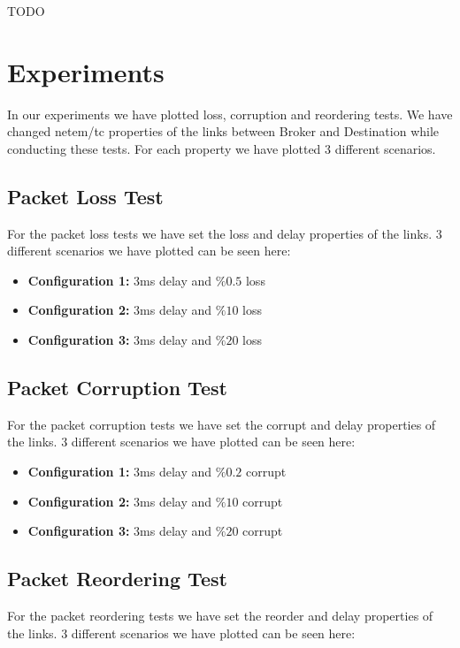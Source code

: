 \documentclass[conference]{IEEEtran}
\begin{document}
TODO

\section{Experiments}

In our experiments we have plotted loss, corruption and reordering tests. We have changed netem/tc properties of the links between Broker and Destination while conducting these tests. For each property we have plotted 3 different scenarios. 

\subsection{Packet Loss Test}\label{AA}

For the packet loss tests we have set the loss and delay properties of the links. 3 different scenarios we have plotted can be seen here:

\begin{itemize}
    \item \textbf{Configuration 1:} 3ms delay and $\%0.5$ loss
    \item \textbf{Configuration 2:} 3ms delay and $\%10$ loss
    \item \textbf{Configuration 3:} 3ms delay and $\%20$ loss
\end{itemize}

\subsection{Packet Corruption Test}\label{AA}

For the packet corruption tests we have set the corrupt and delay properties of the links. 3 different scenarios we have plotted can be seen here:

\begin{itemize}
    \item \textbf{Configuration 1:} 3ms delay and $\%0.2$ corrupt
    \item \textbf{Configuration 2:} 3ms delay and $\%10$ corrupt
    \item \textbf{Configuration 3:} 3ms delay and $\%20$ corrupt
\end{itemize}

\subsection{Packet Reordering Test}\label{AA}

For the packet reordering tests we have set the reorder and delay properties of the links. 3 different scenarios we have plotted can be seen here:
\end{document}
